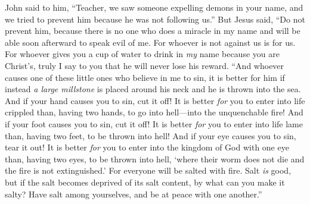 \begin{biblechapter}
 John said to him, “Teacher, we saw someone expelling demons in your name, and we tried to prevent him because he was not following us.”
\verse But Jesus said, “Do not prevent him, because there is no one who does a miracle in my name and will be able soon afterward to speak evil of me.
\verse For whoever is not against us is for us.
\verse For whoever gives you a cup of water to drink in \textit{my} name because you are Christ’s, truly I say to you that he will never lose his reward.
 “And whoever causes one of these little ones who believe in me to sin, it is better for him if instead \textit{a large millstone} is placed around his neck and he is thrown into the sea.
\verse And if your hand causes you to sin, cut it off! It is better \textit{for} you to enter into life crippled than, having two hands, to go into hell—into the unquenchable fire!
\verse And if your foot causes you to sin, cut it off! It is better \textit{for} you to enter into life lame than, having two feet, to be thrown into hell!
\verse And if your eye causes you to sin, tear it out! It is better \textit{for} you to enter into the kingdom of God with one eye than, having two eyes, to be thrown into hell,
\verse ‘where their worm does not die and the fire is not extinguished.’
\verse For everyone will be salted with fire.
\verse Salt \textit{is} good, but if the salt becomes deprived of its salt content, by what can you make it salty? Have salt among yourselves, and be at peace with one another.”
\end{biblechapter}

